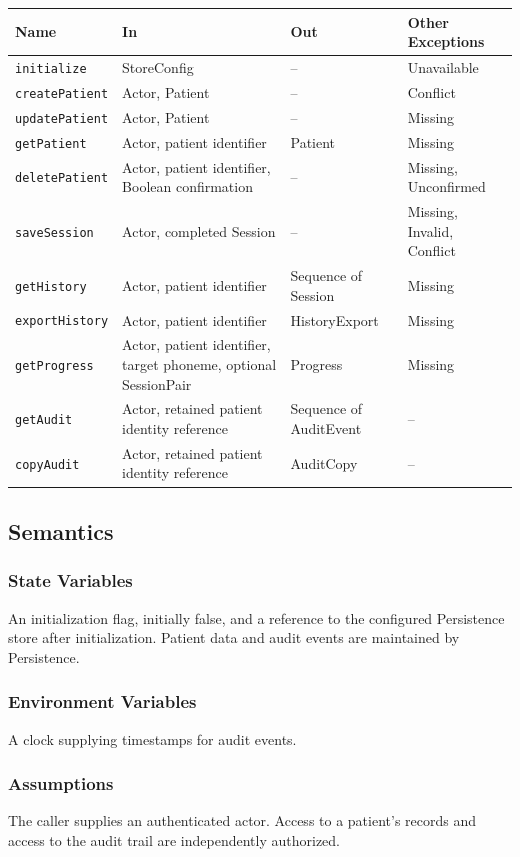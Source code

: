 \documentclass[12pt, titlepage]{article}
\begin{document}
\noindent\begin{tabularx}{\textwidth}{@{}l X X l@{}}
\toprule
\textbf{Name} & \textbf{In} & \textbf{Out} & \textbf{Other Exceptions}\\
\midrule
\texttt{initialize} & StoreConfig & -- & Unavailable\\
\texttt{createPatient} & Actor, Patient & -- & Conflict\\
\texttt{updatePatient} & Actor, Patient & -- & Missing\\
\texttt{getPatient} & Actor, patient identifier & Patient & Missing\\
\texttt{deletePatient} & Actor, patient identifier, Boolean confirmation & -- &
Missing, Unconfirmed\\
\texttt{saveSession} & Actor, completed Session & -- & Missing, Invalid, Conflict\\
\texttt{getHistory} & Actor, patient identifier & Sequence of Session & Missing\\
\texttt{exportHistory} & Actor, patient identifier & HistoryExport & Missing\\
\texttt{getProgress} & Actor, patient identifier, target phoneme,
optional SessionPair & Progress & Missing\\
\texttt{getAudit} & Actor, retained patient identity reference &
Sequence of AuditEvent & --\\
\texttt{copyAudit} & Actor, retained patient identity reference &
AuditCopy & --\\
\bottomrule
\end{tabularx}

\subsection{Semantics}
\subsubsection{State Variables}
An initialization flag, initially false, and a reference to the configured
Persistence store after initialization. Patient data and audit events are
maintained by Persistence.

\subsubsection{Environment Variables}
A clock supplying timestamps for audit events.

\subsubsection{Assumptions}
The caller supplies an authenticated actor. Access to a patient's records and
access to the audit trail are independently authorized.
\end{document}
